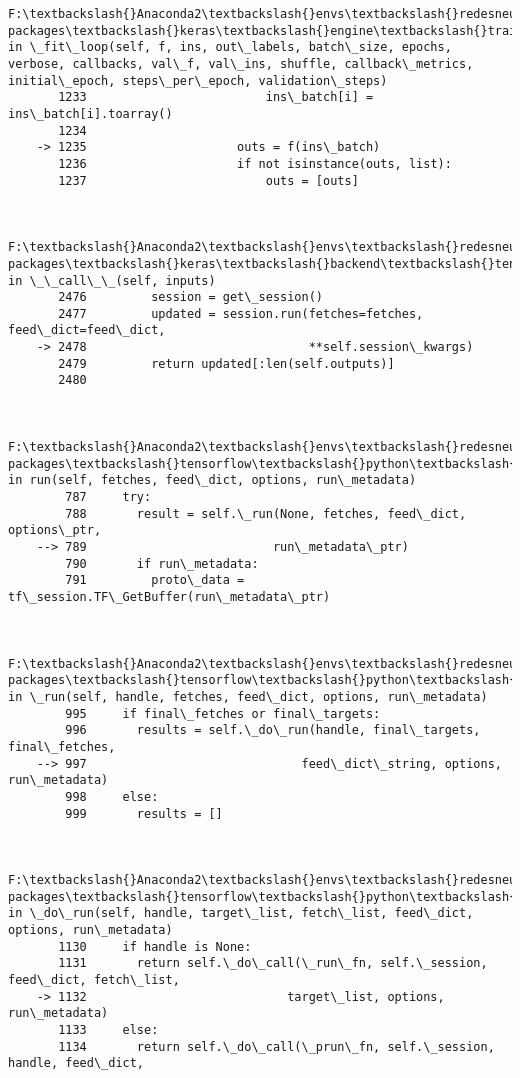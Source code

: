 \documentclass[11pt]{article}
\begin{document}
\begin{Verbatim}[commandchars=\\\{\}]
        F:\textbackslash{}Anaconda2\textbackslash{}envs\textbackslash{}redesneuronales\textbackslash{}lib\textbackslash{}site-packages\textbackslash{}keras\textbackslash{}engine\textbackslash{}training.py in \_fit\_loop(self, f, ins, out\_labels, batch\_size, epochs, verbose, callbacks, val\_f, val\_ins, shuffle, callback\_metrics, initial\_epoch, steps\_per\_epoch, validation\_steps)
       1233                         ins\_batch[i] = ins\_batch[i].toarray()
       1234 
    -> 1235                     outs = f(ins\_batch)
       1236                     if not isinstance(outs, list):
       1237                         outs = [outs]


        F:\textbackslash{}Anaconda2\textbackslash{}envs\textbackslash{}redesneuronales\textbackslash{}lib\textbackslash{}site-packages\textbackslash{}keras\textbackslash{}backend\textbackslash{}tensorflow\_backend.py in \_\_call\_\_(self, inputs)
       2476         session = get\_session()
       2477         updated = session.run(fetches=fetches, feed\_dict=feed\_dict,
    -> 2478                               **self.session\_kwargs)
       2479         return updated[:len(self.outputs)]
       2480 


        F:\textbackslash{}Anaconda2\textbackslash{}envs\textbackslash{}redesneuronales\textbackslash{}lib\textbackslash{}site-packages\textbackslash{}tensorflow\textbackslash{}python\textbackslash{}client\textbackslash{}session.py in run(self, fetches, feed\_dict, options, run\_metadata)
        787     try:
        788       result = self.\_run(None, fetches, feed\_dict, options\_ptr,
    --> 789                          run\_metadata\_ptr)
        790       if run\_metadata:
        791         proto\_data = tf\_session.TF\_GetBuffer(run\_metadata\_ptr)


        F:\textbackslash{}Anaconda2\textbackslash{}envs\textbackslash{}redesneuronales\textbackslash{}lib\textbackslash{}site-packages\textbackslash{}tensorflow\textbackslash{}python\textbackslash{}client\textbackslash{}session.py in \_run(self, handle, fetches, feed\_dict, options, run\_metadata)
        995     if final\_fetches or final\_targets:
        996       results = self.\_do\_run(handle, final\_targets, final\_fetches,
    --> 997                              feed\_dict\_string, options, run\_metadata)
        998     else:
        999       results = []


        F:\textbackslash{}Anaconda2\textbackslash{}envs\textbackslash{}redesneuronales\textbackslash{}lib\textbackslash{}site-packages\textbackslash{}tensorflow\textbackslash{}python\textbackslash{}client\textbackslash{}session.py in \_do\_run(self, handle, target\_list, fetch\_list, feed\_dict, options, run\_metadata)
       1130     if handle is None:
       1131       return self.\_do\_call(\_run\_fn, self.\_session, feed\_dict, fetch\_list,
    -> 1132                            target\_list, options, run\_metadata)
       1133     else:
       1134       return self.\_do\_call(\_prun\_fn, self.\_session, handle, feed\_dict,



\end{Verbatim}
\end{document}

